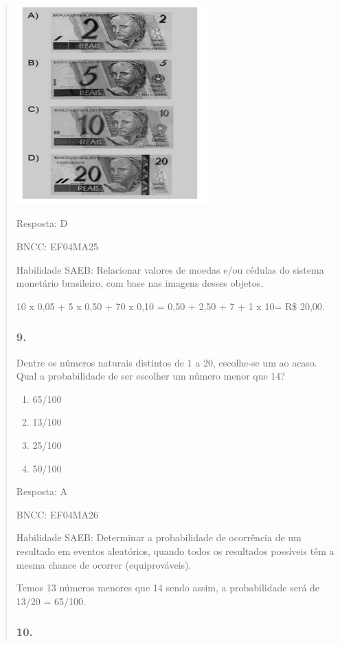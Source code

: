 \begin{enumerate}
\begin{escolha}
\begin{enumerate}
\begin{itemize}
\begin{itemize}
\begin{escolha}
\begin{quote}
\begin{escolha}
{\includegraphics[width=2.93590in,height=3.00930in]{media/image168.png}

Resposta: D

BNCC: EF04MA25

Habilidade SAEB: Relacionar valores de moedas e/ou cédulas do sistema
monetário brasileiro, com base nas imagens desses objetos.

10 x 0,05 + 5 x 0,50 + 70 x 0,10 = 0,50 + 2,50 + 7 + 1 x 10= R\$ 20,00.

\subsubsection{9.}\label{section-195}

Dentre os números naturais distintos de 1 a 20, escolhe-se um ao acaso.
Qual a probabilidade de ser escolher um número menor que 14?

\begin{enumerate}
\def\labelenumi{\alph{enumi})}
\item
  65/100
\item
  13/100
\item
  25/100
\item
  50/100
\end{enumerate}

Resposta: A

BNCC: EF04MA26

Habilidade SAEB: Determinar a probabilidade de ocorrência de um
resultado em eventos aleatórios, quando todos os resultados possíveis
têm a mesma chance de ocorrer (equiprováveis).

Temos 13 números menores que 14 sendo assim, a probabilidade será de
13/20 = 65/100.

\subsubsection{10.}\label{section-196}

}
\end{escolha}
\end{quote}
\end{escolha}
\end{itemize}
\end{itemize}
\end{enumerate}
\end{escolha}
\end{enumerate}
